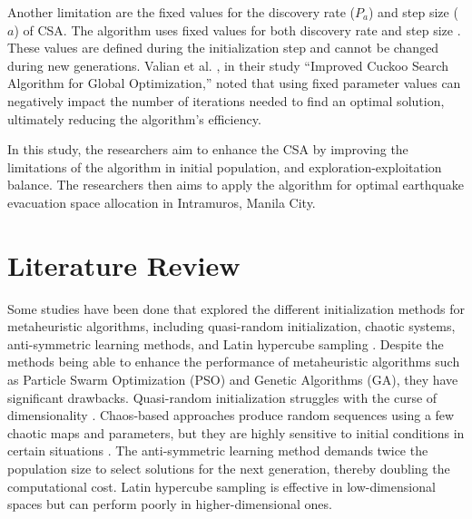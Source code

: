 \documentclass{article}
\begin{document}
Another limitation are the fixed values for the discovery rate ($P_a$) and step size ($a$) of CSA. The algorithm uses fixed values for both discovery rate and step size . These values are defined during the initialization step and cannot be changed during new generations. Valian et al. \cite{valian2011improved}, in their study “Improved Cuckoo Search Algorithm for Global Optimization,” noted that using fixed parameter values can negatively impact the number of iterations needed to find an optimal solution, ultimately reducing the algorithm’s efficiency. 

In this study, the researchers aim to enhance the CSA by improving the limitations of the algorithm in initial population, and exploration-exploitation balance. The researchers then aims to apply the algorithm for optimal earthquake evacuation space allocation in Intramuros, Manila City.

\section{Literature Review}
Some studies have been done that explored the different initialization methods for metaheuristic algorithms, including quasi-random initialization, chaotic systems, anti-symmetric learning methods, and Latin hypercube sampling \cite{li2020influence}. Despite the methods being able to enhance the performance of metaheuristic algorithms such as Particle Swarm Optimization (PSO) and Genetic Algorithms (GA), they have significant drawbacks. Quasi-random initialization struggles with the curse of dimensionality \cite{maaranen2004quasi}. Chaos-based approaches produce random sequences using a few chaotic maps and parameters, but they are highly sensitive to initial conditions in certain situations \cite{dos2008use}. The anti-symmetric learning method demands twice the population size to select solutions for the next generation, thereby doubling the computational cost. Latin hypercube sampling is effective in low-dimensional spaces but can perform poorly in higher-dimensional ones.
\end{document}
